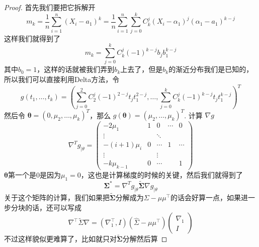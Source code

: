 \documentclass{article}
\newtheorem*{proof}{Proof}
\begin{document}
\begin{proof}
	首先我们要把它拆解开
	$$m_k=\frac{1}{n} \sum_{i=1}^n\left(X_i-a_1\right)^k=\frac{1}{n} \sum_{i=1}^n \sum_{j=0}^k C_k^j\left(X_i-\alpha_1\right)^j\left(\alpha_1-a_1\right)^{k-j}$$这样我们就得到了
	$$
	m_k=\sum_{j=0}^k C_k^j(-1)^{k-j} b_j b_1^{k-j}
	$$
	其中$b_0=1$，这样的话就被我们弄到$b_k$上去了，但是$b_k$的渐近分布我们是已知的，所以我们可以直接利用Delta方法，令
	$$
	g\left(t_1, \ldots, t_k\right)=\left(\sum_{j=0}^2 C_2^j(-1)^{2-j} t_j t_1^{2-j}, \ldots, \sum_{j=0}^k C_k^j(-1)^{k-j} t_j t_1^{k-j}\right)^T
	$$
	然后令 $\boldsymbol{\theta}=\left(0, \mu_2, \ldots, \mu_k\right)^T$，那么 $g(\boldsymbol{\theta})=\left(\mu_2, \ldots, \mu_k\right)^T$. 计算 $\nabla g$
	$$
	\nabla^T g_{\mid \theta}=\left(\begin{array}{ccccc}
		-2 \mu_1 & 1 & 0 & \cdots & 0 \\
		\vdots & & \ddots & & \\
		-(i+1) \mu_i & 0 & \cdots & 1 & \cdots \\
		\vdots & & \vdots & & \\
		-k \mu_{k-1} & 0 & \cdots & & 1
	\end{array}\right)
	$$
	$\boldsymbol{\theta}$第一个是0是因为$\mu_1=0$，这也是计算梯度的时候的关键，然后我们就得到了
	$$
	\boldsymbol{\Sigma}^*=\nabla^T g_{\mid \theta} \widetilde{\boldsymbol{\Sigma}} \nabla g_{\mid \theta}
	$$
	关于这个矩阵的计算，我们如果把$\widetilde{\boldsymbol{\Sigma}}$分解成为$\Sigma-\mu\mu^{\top}$的话会好算一点，如果进一步分块的话，还可以写成
$$
\nabla^{\top} \tilde{\Sigma} \nabla=\left(\nabla_1^{\top}, I\right)\left(\hat{\Sigma}-\mu \mu^{\top}\right)\left(\begin{array}{l}
	\nabla_1 \\
	I
\end{array}\right)
$$
不过这样貌似更难算了，比如就只对$\widetilde{\boldsymbol{\Sigma}}$分解然后算
\end{proof}
\end{document}
